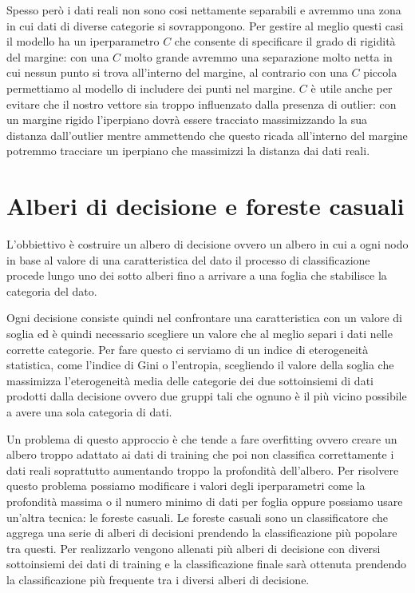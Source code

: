 \documentclass[a4paper,12pt]{report}
\begin{document}
Spesso però i dati reali non sono cosi nettamente separabili e avremmo una zona
in cui dati di diverse categorie si sovrappongono. Per gestire al meglio questi
casi il modello ha un iperparametro $C$ che consente di specificare il grado di
rigidità del margine: con una $C$ molto grande avremmo una separazione molto
netta in cui nessun punto si trova all'interno del margine, al contrario con
una $C$ piccola permettiamo al modello di includere dei punti nel margine. $C$ è
utile anche per evitare che il nostro vettore sia troppo influenzato dalla
presenza di outlier: con un margine rigido l'iperpiano dovrà essere tracciato
massimizzando la sua distanza dall'outlier mentre ammettendo che questo ricada
all'interno del margine potremmo tracciare un iperpiano che massimizzi la distanza dai
dati reali.


\section{Alberi di decisione e foreste casuali}

L'obbiettivo è costruire un albero di decisione ovvero un albero in cui a ogni
nodo in base al valore di una caratteristica del dato il processo di
classificazione procede lungo uno dei sotto alberi fino a arrivare a una foglia
che stabilisce la categoria del dato.

Ogni decisione consiste quindi nel confrontare una caratteristica con un valore
di soglia ed è quindi necessario scegliere un valore che al meglio separi i dati
nelle corrette categorie. Per fare questo ci serviamo di un indice di
eterogeneità statistica, come l'indice di Gini o l'entropia, scegliendo il
valore della soglia che massimizza l'eterogeneità media delle categorie dei due
sottoinsiemi di dati prodotti dalla decisione ovvero due gruppi tali che ognuno
è il più vicino possibile a avere una sola categoria di dati.

Un problema di questo approccio è che tende a fare overfitting ovvero creare un
albero troppo adattato ai dati di training che poi non classifica correttamente
i dati reali soprattutto aumentando troppo la profondità dell'albero. Per
risolvere questo problema possiamo modificare i valori degli iperparametri come
la profondità massima o il numero minimo di dati per foglia oppure possiamo
usare un'altra tecnica: le foreste casuali. Le foreste casuali sono un
classificatore che aggrega una serie di alberi di decisioni prendendo la
classificazione più popolare tra questi. Per realizzarlo vengono allenati più
alberi di decisione con diversi sottoinsiemi dei dati di training e la
classificazione finale sarà ottenuta prendendo la classificazione più frequente
tra i diversi alberi di decisione.
\end{document}

